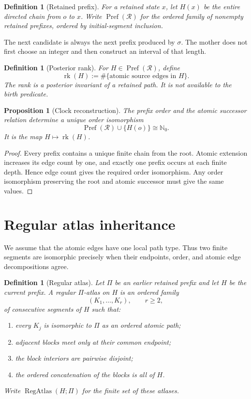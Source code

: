 \documentclass[11pt]{article}
\newtheorem{proposition}[theorem]{Proposition}
\newtheorem{definition}[theorem]{Definition}
\newcommand{\Pref}{\operatorname{Pref}}
\newcommand{\rk}{\operatorname{rk}}
\newcommand{\RegAtlas}{\operatorname{RegAtlas}}
\newcommand{\NN}{\mathbb N}
\begin{document}
\begin{definition}[Retained prefix]
For a retained state $x$, let $H(x)$ be the entire directed chain from $o$ to
$x$.  Write $\Pref(\mathscr R)$ for the ordered family of nonempty retained
prefixes, ordered by initial-segment inclusion.
\end{definition}

The next candidate is always the next prefix produced by $\sigma$.  The
mother does not first choose an integer and then construct an interval of that
length.

\begin{definition}[Posterior rank]
For $H\in\Pref(\mathscr R)$, define
\[
\rk(H)
:=
\#\{\text{atomic source edges in }H\}.
\]
The rank is a posterior invariant of a retained path.  It is not available to
the birth predicate.
\end{definition}

\begin{proposition}[Clock reconstruction]
The prefix order and the atomic successor relation determine a unique order
isomorphism
\[
\Pref(\mathscr R)\cup\{H(o)\}\cong\NN_0.
\]
It is the map $H\mapsto\rk(H)$.
\end{proposition}

\begin{proof}
Every prefix contains a unique finite chain from the root.  Atomic extension
increases its edge count by one, and exactly one prefix occurs at each finite
depth.  Hence edge count gives the required order isomorphism.  Any order
isomorphism preserving the root and atomic successor must give the same
values.
\end{proof}

\section{Regular atlas inheritance}

We assume that the atomic edges have one local path type.  Thus two finite
segments are isomorphic precisely when their endpoints, order, and atomic
edge decompositions agree.

\begin{definition}[Regular atlas]
Let $\Pi$ be an earlier retained prefix and let $H$ be the current prefix.  A
\emph{regular $\Pi$-atlas} on $H$ is an ordered family
\[
(K_1,\ldots,K_r),\qquad r\ge 2,
\]
of consecutive segments of $H$ such that:
\begin{enumerate}[label=(\roman*)]
\item every $K_j$ is isomorphic to $\Pi$ as an ordered atomic path;
\item adjacent blocks meet only at their common endpoint;
\item the block interiors are pairwise disjoint;
\item the ordered concatenation of the blocks is all of $H$.
\end{enumerate}
Write $\RegAtlas(H;\Pi)$ for the finite set of these atlases.
\end{definition}
\end{document}
